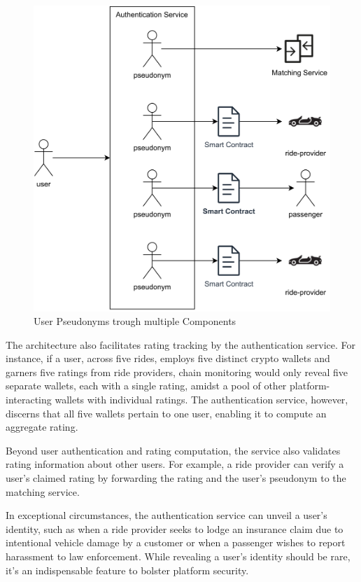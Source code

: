 \begin{figure}[h]
    \centering
    \includegraphics[height=0.40\textheight]{data/2.svg}
    \caption{User Pseudonyms trough multiple Components}
    \label{fig:directSVG}
\end{figure}


The architecture also facilitates rating tracking by the authentication service. For instance, if a user, across five rides, employs five distinct crypto wallets and garners five ratings from ride providers, chain monitoring would only reveal five separate wallets, each with a single rating, amidst a pool of other platform-interacting wallets with individual ratings. The authentication service, however, discerns that all five wallets pertain to one user, enabling it to compute an aggregate rating.

Beyond user authentication and rating computation, the service also validates rating information about other users. For example, a ride provider can verify a user's claimed rating by forwarding the rating and the user's pseudonym to the matching service. 

In exceptional circumstances, the authentication service can unveil a user's identity, such as when a ride provider seeks to lodge an insurance claim due to intentional vehicle damage by a customer or when a passenger wishes to report harassment to law enforcement. While revealing a user's identity should be rare, it's an indispensable feature to bolster platform security.

